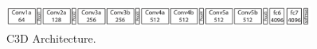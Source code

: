 \begin{figure}[!htb]	\includegraphics[width=0.9\textwidth]{images/c3d_architecture.png} 
    \centering

\caption{
C3D Architecture. \cite{Tran2015LearningNetworks}
} 

\label{fig:c3d_architecture}
\end{figure}